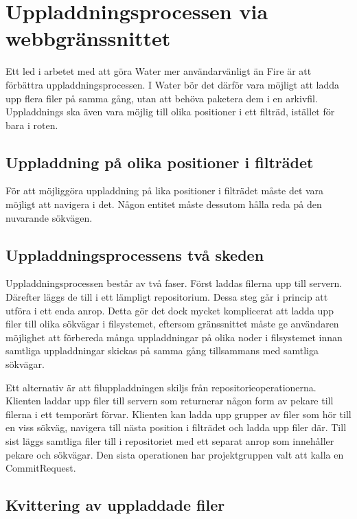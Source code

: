 \section{Uppladdningsprocessen via webbgränssnittet}

Ett led i arbetet med att göra Water mer användarvänligt än Fire är att förbättra uppladdningsprocessen. I Water bör det därför vara möjligt att ladda upp flera filer på samma gång, utan att behöva paketera dem i en arkivfil. Uppladdnings ska även vara möjlig till olika positioner i ett filträd, istället för bara i roten.

\subsection{Uppladdning på olika positioner i filträdet}

För att möjliggöra uppladdning på lika positioner i filträdet måste det vara möjligt att navigera i det. Någon entitet måste dessutom hålla reda på den nuvarande sökvägen.

\subsection{Uppladdningsprocessens två skeden}
Uppladdningsprocessen består av två faser. Först laddas filerna upp till servern. Därefter läggs de till i ett lämpligt repositorium. Dessa steg går i princip att utföra i ett enda anrop. Detta gör det dock mycket komplicerat att ladda upp filer till olika sökvägar i filsystemet, eftersom gränssnittet  måste ge användaren möjlighet att förbereda många uppladdningar på olika noder i filsystemet innan samtliga uppladdningar skickas på samma gång tillsammans med samtliga sökvägar.

Ett alternativ är att filuppladdningen skiljs från repositorieoperationerna. Klienten laddar upp filer till servern som returnerar någon form av pekare till filerna i ett temporärt förvar. Klienten kan ladda upp grupper av filer som hör till en viss sökväg, navigera till nästa position i filträdet och ladda upp filer där. Till sist läggs samtliga filer till i repositoriet med ett separat anrop som innehåller pekare och sökvägar. Den sista operationen har projektgruppen valt att kalla en CommitRequest.

\subsection{Kvittering av uppladdade filer}

